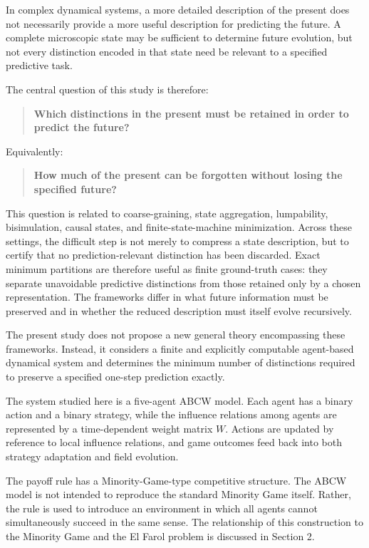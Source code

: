 \documentclass[
  11pt,
]{article}
\begin{document}
In complex dynamical systems, a more detailed description of the present
does not necessarily provide a more useful description for predicting
the future. A complete microscopic state may be sufficient to determine
future evolution, but not every distinction encoded in that state need
be relevant to a specified predictive task.

The central question of this study is therefore:

\begin{quote}
\textbf{Which distinctions in the present must be retained in order to
predict the future?}
\end{quote}

Equivalently:

\begin{quote}
\textbf{How much of the present can be forgotten without losing the
specified future?}
\end{quote}

This question is related to coarse-graining, state aggregation,
lumpability, bisimulation, causal states, and finite-state-machine
minimization. Across these settings, the difficult step is not merely to
compress a state description, but to certify that no prediction-relevant
distinction has been discarded. Exact minimum partitions are therefore
useful as finite ground-truth cases: they separate unavoidable predictive
distinctions from those retained only by a chosen representation. The
frameworks differ in what future information must be preserved and in
whether the reduced description must itself evolve recursively.

The present study does not propose a new general theory encompassing
these frameworks. Instead, it considers a finite and explicitly
computable agent-based dynamical system and determines the minimum
number of distinctions required to preserve a specified one-step
prediction exactly.

The system studied here is a five-agent ABCW model. Each agent has a
binary action and a binary strategy, while the influence relations among
agents are represented by a time-dependent weight matrix \({W}\).
Actions are updated by reference to local influence relations, and game
outcomes feed back into both strategy adaptation and field evolution.

The payoff rule has a Minority-Game-type competitive structure. The ABCW
model is not intended to reproduce the standard Minority Game itself.
Rather, the rule is used to introduce an environment in which all agents
cannot simultaneously succeed in the same sense. The relationship of
this construction to the Minority Game and the El Farol problem is
discussed in Section 2.
\end{document}
